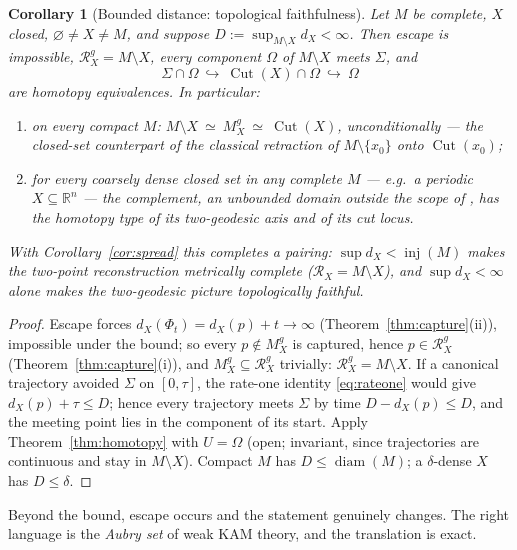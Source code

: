 \documentclass[11pt]{article}
\newtheorem{corollary}[theorem]{Corollary}
\theoremstyle{remark}
\newcommand{\R}{\mathbb{R}}
\newcommand{\X}{X}
\newcommand{\Mg}{M^{g}_{\X}}
\newcommand{\Rx}{\mathcal{R}_{\X}}
\newcommand{\Rg}{\mathcal{R}^{g}_{\X}}
\newcommand{\dX}{d_{\X}}
\newcommand{\inj}{\operatorname{inj}}
\newcommand{\Cut}{\operatorname{Cut}}
\begin{document}
\begin{corollary}[Bounded distance: topological faithfulness]
\label{cor:homotopy}
Let $M$ be complete, $\X$ closed,
$\varnothing\neq\X\neq M$, and suppose
$D:=\sup_{M\setminus\X}\dX<\infty$. Then escape is impossible,
$\Rg=M\setminus\X$, every component $\Omega$ of $M\setminus\X$
meets $\Sigma$, and
\[
  \Sigma\cap\Omega\ \hookrightarrow\ \Cut(\X)\cap\Omega\
  \hookrightarrow\ \Omega
\]
are homotopy equivalences. In particular:
\begin{enumerate}[label=\textup{(\alph*)}]
\item on every compact $M$:
$M\setminus\X\ \simeq\ \Mg\ \simeq\ \Cut(\X)$, unconditionally ---
the closed-set counterpart of the classical retraction of
$M\setminus\{x_{0}\}$ onto $\Cut(x_{0})$;
\item for every coarsely dense closed set in any complete $M$ ---
e.g.\ a periodic $\X\subseteq\R^{n}$ --- the complement, an
\emph{unbounded} domain outside the scope of \cite{Lie,ACNS}, has
the homotopy type of its two-geodesic axis and of its cut locus.
\end{enumerate}
With Corollary~\ref{cor:spread} this completes a pairing:
$\sup\dX<\inj(M)$ makes the two-point reconstruction metrically
complete ($\Rx=M\setminus\X$), and $\sup\dX<\infty$ alone makes the
two-geodesic picture topologically faithful.
\end{corollary}

\begin{proof}
Escape forces $\dX(\Phi_{t})=\dX(p)+t\to\infty$
(Theorem~\ref{thm:capture}(ii)), impossible under the bound; so
every $p\notin\Mg$ is captured, hence $p\in\Rg$
(Theorem~\ref{thm:capture}(i)), and $\Mg\subseteq\Rg$ trivially:
$\Rg=M\setminus\X$. If a canonical trajectory avoided $\Sigma$ on
$[0,\tau]$, the rate-one identity \eqref{eq:rateone} would give
$\dX(p)+\tau\le D$; hence every trajectory meets $\Sigma$ by time
$D-\dX(p)\le D$, and the meeting point lies in the component of its
start. Apply Theorem~\ref{thm:homotopy} with $U=\Omega$ (open;
invariant, since trajectories are continuous and stay in
$M\setminus\X$). Compact $M$ has $D\le\operatorname{diam}(M)$; a
$\delta$-dense $\X$ has $D\le\delta$.
\end{proof}

Beyond the bound, escape occurs and the statement genuinely changes.
The right language is the \emph{Aubry set} of weak KAM theory, and
the translation is exact.
\end{document}
